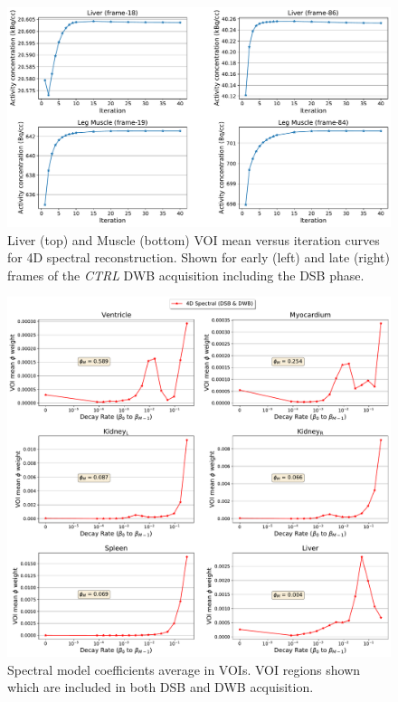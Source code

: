 \begin{figure} [ht!]
\centering
\includegraphics[scale=0.5,angle=0]{3_Results/3_3_DWB_Reconstruction/figures/3_3_IsotoPK_CTRL_DWB_4D_Convergence.pdf}
\caption{Liver (top) and Muscle (bottom) VOI mean versus iteration curves for 4D spectral reconstruction. Shown for early (left) and late (right) frames of the \textit{CTRL} DWB acquisition including the DSB phase.}
\label{fig_3_3:IsotoPK_CTRL_DSB_3D_Convergence}
\end{figure} 


\begin{figure} [ht!]
\centering
\includegraphics[scale=0.48,angle=0]{3_Results/3_3_DWB_Reconstruction/figures/3_3_IsotoPK_CTRL_DWB_SpectralParams_central_.pdf}
\caption{Spectral model coefficients average in VOIs. VOI regions shown which are included in both DSB and DWB acquisition.}
\label{fig_3_3:IsotoPK_CTRL_DWB_Spectrals}
\end{figure} 

